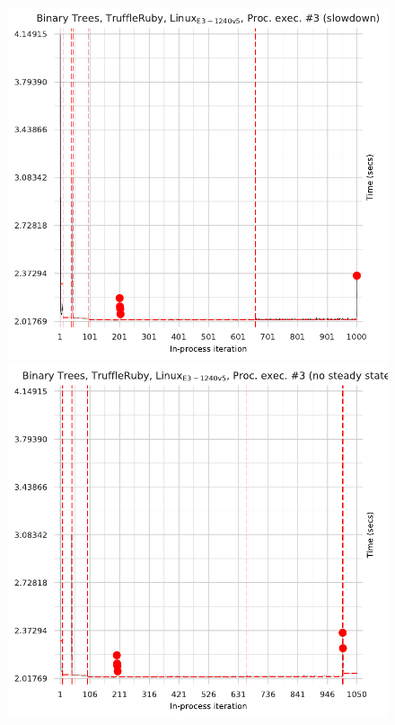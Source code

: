 \documentclass[acmsmall,screen]{acmart}
\begin{document}
\begin{figure}[!tbp]
\centering
\begin{minipage}[t]{0.485\textwidth}
\includegraphics[width=\textwidth]{examples/truncated1.pdf}
\end{minipage}
\hfill
\begin{minipage}[t]{0.485\textwidth}
\includegraphics[width=\textwidth]{examples/truncated2.pdf}

\end{minipage}
\end{figure}
\end{document}
